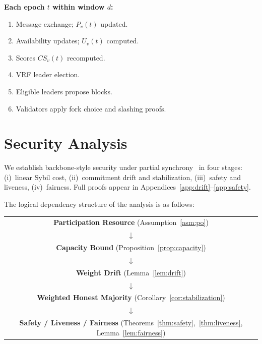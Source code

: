 \documentclass[10pt,journal,twoside]{IEEEtran}
\theoremstyle{remark}
\newcommand{\CS}{\mathit{CS}}
\begin{document}
	\noindent\textbf{Each epoch $t$ within window $d$:}
	\begin{enumerate}
		\item Message exchange; $P_v(t)$ updated.
		\item Availability updates; $U_v(t)$ computed.
		\item Scores $\CS_v(t)$ recomputed.
		\item VRF leader election.
		\item Eligible leaders propose blocks.
		\item Validators apply fork choice and slashing proofs.
	\end{enumerate}
	
	\section{Security Analysis}
	\label{sec:security}
	
	We establish backbone-style security under partial
	synchrony~\cite{dwork1988partialsync} in four stages:
	(i)~linear Sybil cost, (ii)~commitment drift and
	stabilization, (iii)~safety and liveness, (iv)~fairness.
	Full proofs appear in
	Appendices~\ref{app:drift}--\ref{app:safety}.
	
	The logical dependency structure of the analysis is as
	follows:
	
	\medskip
	\noindent
	\begin{minipage}{\columnwidth}
		\centering
		\small
		\begin{tabular}{c}
			\textbf{Participation Resource} (Assumption~\ref{asm:po}) \\
			$\downarrow$ \\
			\textbf{Capacity Bound} (Proposition~\ref{prop:capacity}) \\
			$\downarrow$ \\
			\textbf{Weight Drift} (Lemma~\ref{lem:drift}) \\
			$\downarrow$ \\
			\textbf{Weighted Honest Majority}
			(Corollary~\ref{cor:stabilization}) \\
			$\downarrow$ \\
			\textbf{Safety / Liveness / Fairness}
			(Theorems~\ref{thm:safety},~\ref{thm:liveness},
			Lemma~\ref{lem:fairness}) \\
		\end{tabular}
	\end{minipage}
	\medskip
	
\end{document}
